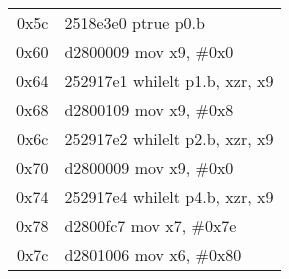 \documentclass[11pt,a4paper]{article}
\begin{document}
\begin{longtable}{|r|l|}
\rowcolor{prologue} 0x5c & 2518e3e0 \quad ptrue p0.b \\
\rowcolor{prologue} 0x60 & d2800009 \quad mov x9, \#0x0 \\
\rowcolor{prologue} 0x64 & 252917e1 \quad whilelt p1.b, xzr, x9 \\
\rowcolor{prologue} 0x68 & d2800109 \quad mov x9, \#0x8 \\
\rowcolor{prologue} 0x6c & 252917e2 \quad whilelt p2.b, xzr, x9 \\
\rowcolor{prologue} 0x70 & d2800009 \quad mov x9, \#0x0 \\
\rowcolor{prologue} 0x74 & 252917e4 \quad whilelt p4.b, xzr, x9 \\
\rowcolor{prologue} 0x78 & d2800fc7 \quad mov x7, \#0x7e \\
\rowcolor{prologue} 0x7c & d2801006 \quad mov x6, \#0x80 \\


\end{longtable}
\end{document}
